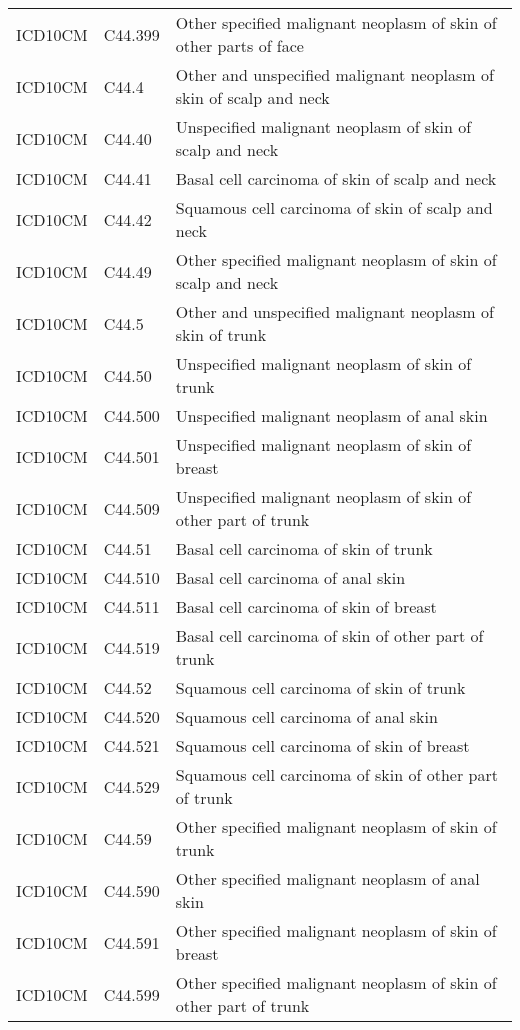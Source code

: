 \begin{longtable}{p{}p{}p{}}
  ICD10CM & C44.399 & Other specified malignant neoplasm of skin of other parts of face \\ 
  ICD10CM & C44.4 & Other and unspecified malignant neoplasm of skin of scalp and neck \\ 
  ICD10CM & C44.40 & Unspecified malignant neoplasm of skin of scalp and neck \\ 
  ICD10CM & C44.41 & Basal cell carcinoma of skin of scalp and neck \\ 
  ICD10CM & C44.42 & Squamous cell carcinoma of skin of scalp and neck \\ 
  ICD10CM & C44.49 & Other specified malignant neoplasm of skin of scalp and neck \\ 
  ICD10CM & C44.5 & Other and unspecified malignant neoplasm of skin of trunk \\ 
  ICD10CM & C44.50 & Unspecified malignant neoplasm of skin of trunk \\ 
  ICD10CM & C44.500 & Unspecified malignant neoplasm of anal skin \\ 
  ICD10CM & C44.501 & Unspecified malignant neoplasm of skin of breast \\ 
  ICD10CM & C44.509 & Unspecified malignant neoplasm of skin of other part of trunk \\ 
  ICD10CM & C44.51 & Basal cell carcinoma of skin of trunk \\ 
  ICD10CM & C44.510 & Basal cell carcinoma of anal skin \\ 
  ICD10CM & C44.511 & Basal cell carcinoma of skin of breast \\ 
  ICD10CM & C44.519 & Basal cell carcinoma of skin of other part of trunk \\ 
  ICD10CM & C44.52 & Squamous cell carcinoma of skin of trunk \\ 
  ICD10CM & C44.520 & Squamous cell carcinoma of anal skin \\ 
  ICD10CM & C44.521 & Squamous cell carcinoma of skin of breast \\ 
  ICD10CM & C44.529 & Squamous cell carcinoma of skin of other part of trunk \\ 
  ICD10CM & C44.59 & Other specified malignant neoplasm of skin of trunk \\ 
  ICD10CM & C44.590 & Other specified malignant neoplasm of anal skin \\ 
  ICD10CM & C44.591 & Other specified malignant neoplasm of skin of breast \\ 
  ICD10CM & C44.599 & Other specified malignant neoplasm of skin of other part of trunk \\ 

\end{longtable}
